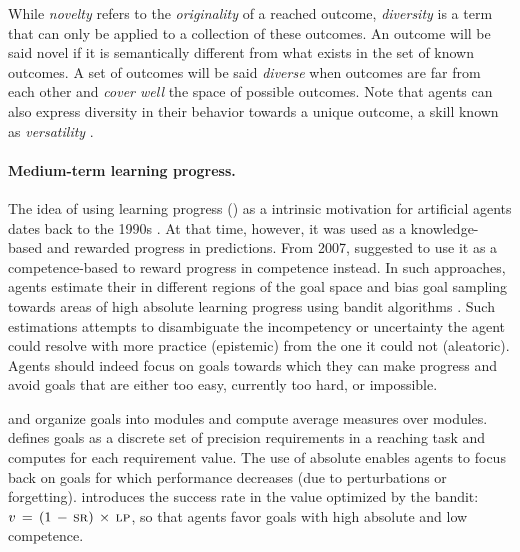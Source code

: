 While \textit{novelty} refers to the \textit{originality} of a reached outcome, \textit{diversity} is a term that can only be applied to a collection of these outcomes. An outcome will be said novel if it is semantically different from what exists in the set of known outcomes. A set of outcomes will be said \textit{diverse} when outcomes are far from each other and \textit{cover well} the space of possible outcomes. Note that agents can also express diversity in their behavior towards a unique outcome, a skill known as \textit{versatility} \cite{hausman_learning_2018,kumar_one_2020,osa_discovering_2021,celik_specializing_2021}.

\paragraph{Medium-term learning progress.} 
The idea of using learning progress (\lp) as a intrinsic motivation for artificial agents dates back to the 1990s \cite{schmidhuber1991curious,schmidhuber1991learning,kaplan_maximizing_2004,oudeyer_intrinsic_2007}. At that time, however, it was used as a knowledge-based \im and rewarded progress in predictions. From 2007, \cite{oudeyer2007intrinsic} suggested to use it as a competence-based \im to reward progress in competence instead. In such approaches, agents estimate their \lp in different regions of the goal space and bias goal sampling towards areas of high absolute learning progress using bandit algorithms \cite{baranes2013active,moulinfriergmm,forestier2016modular,fournier2018accuracy,fournier2019clic,curious,blaes2019control,portelas_teacher_2020,akakzia2020decstr}. Such estimations attempts to disambiguate the incompetency or uncertainty the agent could resolve with more practice (epistemic) from the one it could not (aleatoric). Agents should indeed focus on goals towards which they can make progress and avoid goals that are either too easy, currently too hard, or impossible. 

\cite{forestier2016modular,curious,blaes2019control} and \cite{akakzia2020decstr} organize goals into modules and compute average \lp measures over modules. \cite{fournier2018accuracy} defines goals as a discrete set of precision requirements in a reaching task and computes \lp for each requirement value. The use of absolute \lp enables agents to focus back on goals for which performance decreases (due to perturbations or forgetting). \cite{akakzia2020decstr} introduces the success rate in the value optimized by the bandit: $v\,=\,(1\,-\,\text{\textsc{sr}})\,\times\,\text{\textsc{lp}}$, so that agents favor goals with high absolute \lp and low competence.

